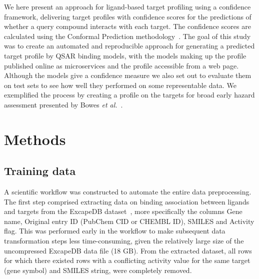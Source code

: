 \documentclass[utf8]{frontiersSCNS} %
\begin{document}
We here present an approach for ligand-based target profiling using a
confidence framework, delivering target profiles with confidence scores for the
predictions of whether a query compound interacts with each target. The
confidence scores are calculated using the Conformal Prediction
methodology~\cite{Vovk2005}.
%
The goal of this study was to create an automated and reproducible approach for
generating a predicted target profile by QSAR binding models, with the models
making up the profile published online as microservices and the profile
accessible from a web page. Although the models give a confidence measure we
also set out to evaluate them on test sets to see how well they performed on some
representable data. We exemplified the process by creating a profile on the
targets for broad early hazard assessment presented by Bowes \textit{et
al.}~\cite{Bowes2012}.

\section*{Methods}

\subsection*{Training data}

A scientific workflow was constructed to automate the entire data
preprocessing.  The first step comprised extracting data on binding association
between ligands and targets from the ExcapeDB dataset~\cite{Sun2017}, more
specifically the columns Gene name, Original entry ID (PubChem CID or CHEMBL
ID), SMILES and Activity flag. This was performed early in the workflow to make
subsequent data transformation steps less time-consuming, given the relatively large
size of the uncompressed ExcapeDB data file (18 GB).
%
From the extracted dataset, all rows for which there existed rows with a conflicting
activity value for the same target (gene symbol) and SMILES string, were completely removed.
\end{document}

